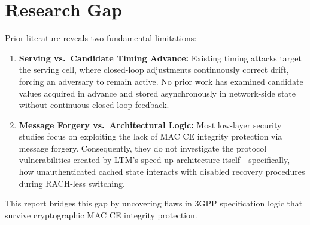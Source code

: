 \section{Research Gap}
\label{sec:gap}

Prior literature reveals two fundamental limitations:
\begin{enumerate}\itemsep2pt
  \item \textbf{Serving vs.\ Candidate Timing Advance:} Existing timing attacks target the serving cell,
        where closed-loop adjustments continuously correct drift, forcing an adversary to remain active.
        No prior work has examined candidate \TA{} values acquired in advance and stored asynchronously in
        network-side state without continuous closed-loop feedback.
  \item \textbf{Message Forgery vs.\ Architectural Logic:} Most low-layer security studies focus on
        exploiting the lack of MAC CE integrity protection via message forgery. Consequently, they do not
        investigate the protocol vulnerabilities created by LTM's speed-up architecture itself---specifically,
        how unauthenticated cached state interacts with disabled recovery procedures during RACH-less
        switching.
\end{enumerate}
This report bridges this gap by uncovering flaws in 3GPP specification logic that survive cryptographic
MAC CE integrity protection.
